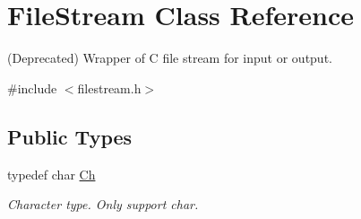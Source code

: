 \hypertarget{class_file_stream}{}\section{File\+Stream Class Reference}
\label{class_file_stream}


(Deprecated) Wrapper of C file stream for input or output.  




{\ttfamily \#include $<$filestream.\+h$>$}

\subsection*{Public Types}
\begin{DoxyCompactItemize}
\item 
\hypertarget{class_file_stream_a400811e8f4424670049662a79ea29a74}{}typedef char \hyperlink{class_file_stream_a400811e8f4424670049662a79ea29a74}{Ch}\label{class_file_stream_a400811e8f4424670049662a79ea29a74}

\begin{DoxyCompactList}\small\item\em Character type. Only support char. \end{DoxyCompactList}\end{DoxyCompactItemize}
